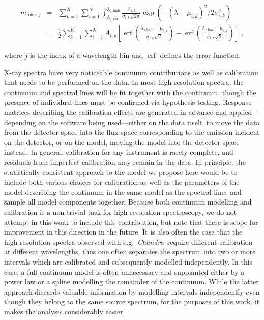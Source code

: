 \documentclass[12pt]{emulateapj}
\newcommand{\project}[1]{\textsl{#1}}
\newcommand{\chandra}{\project{Chandra}}
\newcommand{\mean}{m}
\DeclareMathOperator\erf{erf}
\begin{document}
\begin{eqnarray}
\mean_{\mathrm{lines},j} & = &  \sum_{k=1}^{K}\sum_{i=1}^{N}{\int^{\lambda_{j,\mathrm{high}}}_{\lambda_{j, \mathrm{low}}}{\frac{A_{i,k}}{\sigma_{i,k}\sqrt{2\pi}} \exp{(-(\lambda-\mu_{i,k})^2/{2\sigma_{i,k}^2})}}} \\ \nonumber
& = & \frac{1}{2}  \sum_{k=1}^{K} \sum_{i=1}^{N} A_{i,k}  \left[ \erf{\left( \frac{\lambda_{j,\mathrm{high}} - \mu_{i,k}}{\sigma_{i,k}\sqrt{2}}\right)} - \erf{\left( \frac{\lambda_{j, \mathrm{low}} - \mu_{i,k}}{\sigma_{i,k}\sqrt{2}}\right)} \right] \; ,
\end{eqnarray}

\noindent where $j$ is the index of a wavelength bin and $\erf$ defines the error function. 

X-ray spectra have very noticeable continuum contributions as well as calibration that needs to be performed on the data. In most high-resolution spectra, the continuum and spectral lines will be fit together with the continuum, though the presence of individual lines must be confirmed via hypothesis testing. Response matrices describing the calibration effects are generated in advance and applied---depending on the software being used---either on the data itself, to move the data from the detector space into the flux space corresponding to the emission incident on the detector, or on the model, moving the model into the detector space instead. In general, calibration for any instrument is rarely complete, and residuals from imperfect calibration may remain in the data. 
In principle, the statistically consistent approach to the model we propose here would be to include both various choices for calibration as well as the parameters of the model describing the continuum in the same model as the spectral lines and sample all model components together. Because both continuum modelling and calibration is a non-trivial task for high-resolution spectroscopy, we do not attempt in this work to include this contribution, but note that there is scope for improvement in this direction in the future. %
It is also often the case that the high-resolution spectra observed with e.g.\ \chandra\ require different calibration at different wavelengths, thus one often separates the spectrum into two or more intervals which are calibrated and subsequently modelled independently. In this case, a full continuum model is often unnecessary and supplanted either by a power law or a spline modelling the remainder of the continuum. While the latter approach discards valuable information by modelling intervals independently even though they belong to the same source spectrum, for the purposes of this work, it makes the analysis considerably easier.
\end{document}
